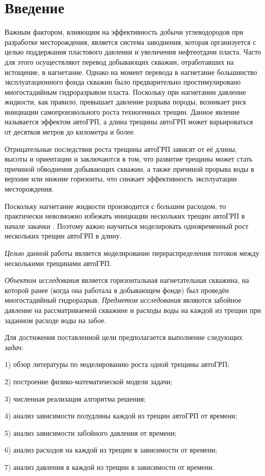 \chapter*{Введение} %


Важным фактором, влияющим на эффективность добычи углеводородов при разработке месторождения, является система заводнения, которая организуется с целью поддержания пластового давления и увеличения нефтеотдачи пласта.
Часто для этого осуществляют перевод добывающих скважин, отработавших на истощение, в нагнетание.
Однако на момент перевода в нагнетание большинство эксплуатационного фонда скважин было предварительно простимулировано многостадийным гидроразрывом пласта.
Поскольку при нагнетании давление жидкости, как правило, превышает давление разрыва породы, возникает риск инициации самопроизвольного роста техногенных трещин.
Данное явление называется эффектом автоГРП, а длина трещины автоГРП может варьироваться от десятков метров до километра и более.

Отрицательные последствия роста трещины автоГРП зависят от её длины, высоты и ориентации и заключаются в том, что развитие трещины может стать причиной обводнения добывающих скважин, а также причиной прорыва воды в верхние или нижние горизонты, что снижает эффективность эксплуатации месторождения.

Поскольку нагнетание жидкости производится с большим расходом, то практически невозможно избежать инициации нескольких трещин автоГРП в начале закачки \cite{baikov_book}.
Поэтому важно научиться моделировать одновременный рост нескольких трещин автоГРП в длину.

\emph{Целью} данной работы является моделирование перераспределения потоков между несколькими трещинами автоГРП.

\emph{Объектом исследования} является горизонтальная нагнетательная скважина, на которой ранее (когда она работала в добывающем фонде) был проведён многостадийный гидроразрыв.
\emph{Предметом исследования} являются забойное давление на рассматриваемой скважине и расходы воды на каждой из трещин при заданном расходе воды на забое.

Для достижения поставленной цели предполагается выполнение следующих \emph{задач}:

1) обзор литературы по моделированию роста одной трещины автоГРП;

2) построение физико-математической модели задачи;

3) численная реализация алгоритма решения;

4) анализ зависимости полудлины каждой из трещин автоГРП от времени;

5) анализ зависимости забойного давления от времени;

6) анализ расходов на каждой из трещин в зависимости от времени;

7) анализ давления в каждой из трещин в зависимости от времени.